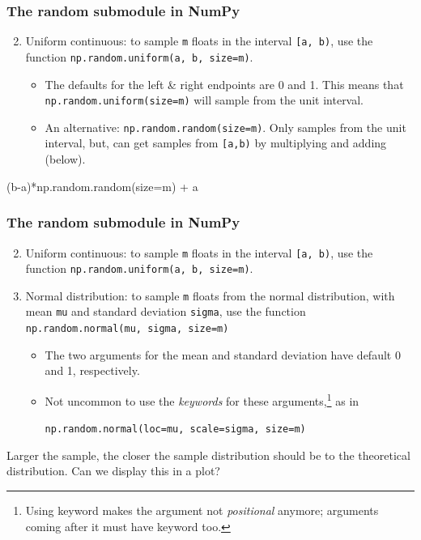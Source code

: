 \documentclass{beamer}
\newenvironment{codeblock}
    {\hfill\begin{beamerboxesrounded}[lower=codecol, width=0.8\textwidth]
    \medskip

    }
    { 
    \end{beamerboxesrounded}\hfill
    }
\theoremstyle{example}
\newcommand{\ttt}[1]{{\small\texttt{#1}}}
\begin{document}
\begin{frame}[fragile]
\frametitle{The {\ttm random} submodule in NumPy}

\begin{enumerate}
    \setcounter{enumi}{1}
    \item Uniform continuous: to sample \ttt{m} floats in the interval \ttt{[a, b)}, use the function \ttt{np.random.uniform(a, b, size=m)}.
    \begin{itemize}
        \item The defaults for the left \& right endpoints are 0 and 1. This means that \ttt{np.random.uniform(size=m)} will sample from the unit interval.
        \item An alternative: \ttt{np.random.random(size=m)}. Only samples from the unit interval, but, can get samples from \ttt{[a,b)} by multiplying and adding (below).
    \end{itemize}
\end{enumerate}

\vspace*{12pt}
\begin{codeblock}

\begin{python}[numbers=none]
(b-a)*np.random.random(size=m) + a
\end{python}

\end{codeblock}

\end{frame}

\begin{frame}[fragile]
    \frametitle{The {\ttm random} submodule in NumPy}
    
    \begin{enumerate}
        \setcounter{enumi}{1}
        \item Uniform continuous: to sample \ttt{m} floats in the interval \ttt{[a, b)}, use the function \ttt{np.random.uniform(a, b, size=m)}.
        \item Normal distribution: to sample \ttt{m} floats from the normal distribution, with mean \ttt{mu} and standard deviation \ttt{sigma}, use the function \ttt{np.random.normal(mu, sigma, size=m)}
        \begin{itemize}
            \item The two arguments for the mean and standard deviation have default 0 and 1, respectively.
            \item Not uncommon to use the \emph{keywords} for these arguments,\footnote{Using keyword makes the argument not \emph{positional} anymore; arguments coming after it must have keyword too.} as in 
            \begin{center}\ttt{np.random.normal(loc=mu, scale=sigma, size=m)}\end{center}
        \end{itemize}
    \end{enumerate}

    Larger the sample, the closer the sample distribution should be to the theoretical distribution. Can we display this in a plot?
\end{frame}
    
\end{document}
